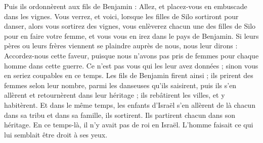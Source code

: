 \begin{multicols}{2}
Puis ils ordonnèrent aux fils de Benjamin : Allez, et placez-vous en embuscade dans les vignes.
Vous verrez, et voici, lorsque les filles de Silo sortiront pour danser, alors vous sortirez des vignes, vous enlèverez chacun une des filles de Silo pour en faire votre femme, et vous vous en irez dans le pays de Benjamin.
Si leurs pères ou leurs frères viennent se plaindre auprès de nous, nous leur dirons : Accordez-nous cette faveur, puisque nous n'avons pas pris de femmes pour chaque homme dans cette guerre.  Ce n'est pas vous qui les leur avez données ; sinon vous en seriez coupables en ce temps.
Les fils de Benjamin firent ainsi ; ils prirent des femmes selon leur nombre, parmi les danseuses qu'ils saisirent, puis ils s'en allèrent et retournèrent dans leur héritage ; ils rebâtirent les villes, et y habitèrent.
Et dans le même temps, les enfants d'Israël s'en allèrent de là chacun dans sa tribu et dans sa famille, ils sortirent. Ils partirent chacun dans son héritage.
En ce temps-là, il n'y avait pas de roi en Israël. L'homme faisait ce qui lui semblait être droit à ses yeux.
\PPE{}
\end{multicols}
